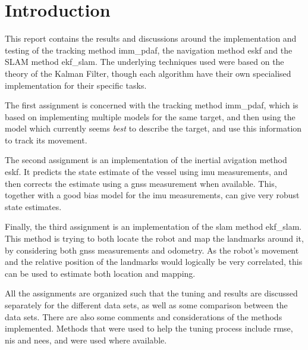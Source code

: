 \section{Introduction}\label{sec:intro}
This report contains the results and discussions around the implementation and testing of the tracking method \acrfull{imm_pdaf}, the navigation method \acrfull{eskf} and the SLAM method \acrfull{ekf_slam}. The underlying techniques used were based on the theory of the Kalman Filter, though each algorithm have their own specialised implementation for their specific tasks. 

The first assignment is concerned with the tracking method \acrshort{imm_pdaf}, which is based on implementing multiple models for the same target, and then using the model which currently seems \textit{best} to describe the target, and use this information to track its movement. 

The second assignment is an implementation of the inertial avigation method \acrshort{eskf}. It predicts the state estimate of the vessel using \acrfull{imu} measurements, and then corrects the estimate using a \acrfull{gnss} measurement when available. This, together with a good bias model for the \acrshort{imu} measurements, can give very robust state estimates. 

Finally, the third assignment is an implementation of the \acrshort{slam} method \acrshort{ekf_slam}. This method is trying to both locate the robot and map the landmarks around it, by considering both \acrshort{gnss} measurements and odometry. As the robot's movement and the relative position of the landmarks would logically be very correlated, this can be used to estimate both location and mapping. 

All the assignments are organized such that the tuning and results are discussed separately for the different data sets, as well as some comparison between the data sets. There are also some comments and considerations of the methods implemented. Methods that were used to help the tuning process include \acrfull{rmse}, \acrfull{nis} and \acrfull{nees}, and were used where available.







